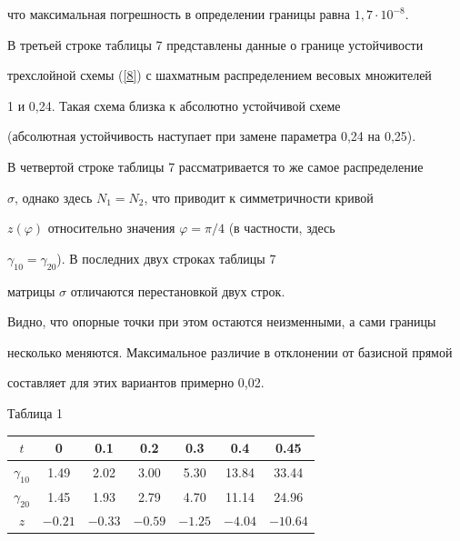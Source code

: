 что максимальная погрешность в определении границы равна $1,7\cdot 10^{-8}$.


В третьей строке таблицы 7 представлены данные о границе устойчивости


трехслойной схемы (\ref{8}) с шахматным распределением весовых множителей


1 и 0,24. Такая схема близка к абсолютно устойчивой схеме


(абсолютная устойчивость наступает при замене параметра 0,24 на 0,25).


В четвертой строке таблицы 7 рассматривается то же самое распределение


$\sigma$, однако здесь $N_1=N_2$, что приводит к симметричности кривой


$z(\varphi)$ относительно значения $\varphi=\pi/4$ (в частности, здесь


$\gamma_{10} = \gamma_{20}$). В последних двух строках таблицы 7


матрицы $\sigma$ отличаются перестановкой двух строк.


Видно, что опорные точки при этом остаются неизменными, а сами границы


несколько меняются. Максимальное различие в отклонении от базисной прямой


составляет для этих вариантов примерно 0,02.


\medskip





\hspace{104mm} Таблица 1


\smallskip





\begin{center}


\begin{tabular}{|c|c|c|c|c|c|c|}


\hline


$t$ & 0 & 0.1 & 0.2 & 0.3 & 0.4 & 0.45 \\


\hline


$\gamma_{10}$ & 1.49 & 2.02 & 3.00 & 5.30 & 13.84 & 33.44 \\


\hline


$\gamma_{20}$ & 1.45 & 1.93 & 2.79 & 4.70 & 11.14 & 24.96 \\


\hline


$z$ & $-0.21$ & $-0.33$ & $-0.59$ & $-1.25$ & $-4.04$ & $-10.64$ \\


\hline


\end{tabular}


\medskip


\end{center}





